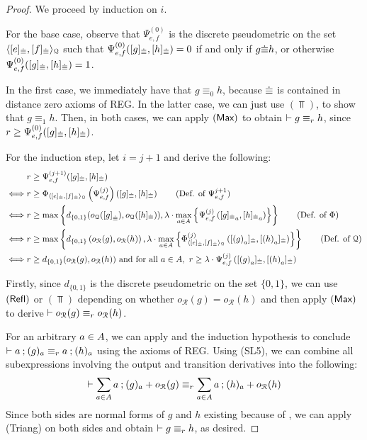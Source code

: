 \begin{proof}

We proceed by induction on $i$. 

For the base case, observe that ${\Psi}_{e,f}^{(0)}$ is the discrete pseudometric on the set $\langle [e]_{{\mathrel{\dot\equiv}}},[f]_{{\mathrel{\dot\equiv}}} \rangle_{\mathcal{Q}}$ such that ${\Psi}_{e,f}^{(0)}([g]_{{\mathrel{\dot\equiv}}}, [h]_{{\mathrel{\dot\equiv}}})=0$ if and only if ${{g} {\mathrel{\dot\equiv}} {h}}$, or otherwise ${\Psi}_{e,f}^{(0)}([g]_{{\mathrel{\dot\equiv}}}, [h]_{{\mathrel{\dot\equiv}}})=1$. 

In the first case, we immediately have that $g \equiv_0 h$, because ${\mathrel{\dot\equiv}}$ is contained in distance zero axioms of \textsf{REG}. In the latter case, we can just use $(\Top)$, to show that $g \equiv_1 h $. Then, in both cases, we can apply $(\textsf{Max})$ to obtain $\vdash g \equiv_{r} h$, since $r \geq {\Psi}_{e,f}^{(0)}([g]_{{\mathrel{\dot\equiv}}}, [h]_{{\mathrel{\dot\equiv}}})$.
	
For the induction step, let $i = j + 1$ and derive the following:
\begin{align*}
    &\e \geq {\Psi}_{e,f}^{(j + 1)}([g]_{\acirel}, [h]_{\acirel})\\
    \iff &\e \geq \Phi_{\gen{[e]_{\acirel},[f]_{\acirel}}{\mathcal{Q}}} \left( {\Psi}_{e,f}^{(j)} \right)\left([g]_{\acirel}, [h]_{\acirel}\right) \tag{Def. of ${\Psi}_{e,f}^{j+1}$}\\
    \iff &\e \geq \max\left\{ d_{\{0,1\}} (o_{\mathcal{Q}}({[g]}_{\acirel}), o_{\mathcal{Q}}([h]_{\acirel})), \lambda \cdot \max_{a \in \alphabet} \left\{ {\Psi}_{e,f}^{(j)}\left({[g]_{\acirel}}_a, {[h]_{\acirel}}_{a}\right) \right\}\right\} \tag{Def. of $\Phi$}\\
    \iff &\e \geq \max\left\{ d_{\{0,1\}} \left(o_{\mathcal{R}}(g), o_{\mathcal{R}}(h)\right), \lambda \cdot \max_{a \in \alphabet} \left\{ \Phi_{\gen{[e]_{\acirel},[f]_{\acirel}}{\mathcal{Q}}}^{(j)}\left({[{(g)}_{a}]_{\acirel}}, {[{(h)}_{a}]_{\acirel}}\right) \right\}\right\} \tag{Def. of $\mathcal{Q}$}\\
    \iff &{\e \geq d_{\{0,1\}} (o_{\mathcal{R}}(g), o_{\mathcal{R}}(h))} \text{ and for all $a \in \alphabet$},~\e \geq \lambda \cdot {\Psi}_{e,f}^{(j)}\left({[{(g)}_{a}]_{\acirel}}, {[{(h)}_{a}]_{\acirel}}\right)
\end{align*}

Firstly, since $d_{\{0,1\}}$ is the discrete pseudometric on the set $\{0,1\}$, we can use $(\textsf{Refl})$ or $(\Top)$ depending on whether $o_{\mathcal{R}}(g) = o_{\mathcal{R}}(h)$ and then apply $(\textsf{Max})$ to derive $\vdash o_{\mathcal{R}}(g) \equiv_r o_{\mathcal{R}}(h)$. 

For an arbitrary $a \in {A}$, we can apply  and the induction hypothesis to conclude $\vdash a\mathbin{;} (g)_a \equiv_{r} a \mathbin{;} (h)_a $ using the axioms of \textsf{REG}. Using \textsf{(SL5)}, we can combine all subexpressions involving the output and transition derivatives into the following:
	$$
	\vdash \sum_{a \in {A}} a \mathbin{;} (g)_a + o_{\mathcal{R}}(g) \equiv_{r} \sum_{a \in {A}} a \mathbin{;} (h)_a + o_{\mathcal{R}}(h)
	$$
	Since both sides are normal forms of $g$ and $h$ existing because of , we can apply \textsf{(Triang)} on both sides and obtain $\vdash g \equiv_{r} h$, as desired.
\end{proof}
